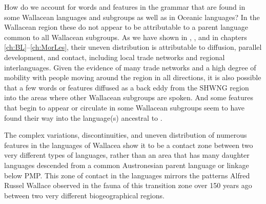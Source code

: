 How do we account for words
and features in the grammar that are found in some Wallacean
languages and subgroups as well as in Oceanic languages? In the Wallacean
region these do not appear to be attributable to a parent language
common to all Wallacean subgroups.
As we have shown in , ,
 and in chapters \ref{ch:BL}--\ref{ch:MorLes},
their uneven distribution is attributable to diffusion,
parallel development, and contact,
including local trade networks and regional interlanguages.
Given the evidence of many trade networks
and a high degree of mobility with people moving around the region
in all directions, it is also possible that a few words or features diffused as
a back eddy from the SHWNG region into the areas where other
Wallacean subgroups are spoken.
And some features that begin to appear or circulate in some Wallacean
subgroups seem to have found their way into the language(s) ancestral to .

The complex variations, discontinuities, and uneven distribution of numerous features
in the languages of Wallacea show it to be a contact zone between two very different
types of languages, rather than an area that has many daughter languages descended
from a common Austronesian parent language or linkage below PMP.
This zone of contact in the languages mirrors the patterns
Alfred Russel Wallace observed in the fauna of this transition
zone over 150 years ago between two very different biogeographical regions.